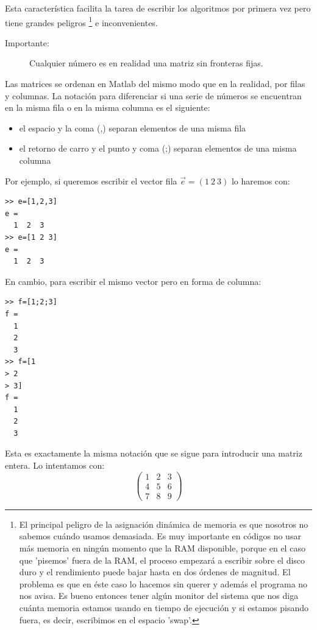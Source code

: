 Esta característica facilita la tarea de escribir los algoritmos por
primera vez pero tiene grandes peligros \footnote{El principal peligro
  de la asignación dinámica de memoria es que nosotros no sabemos
  cuándo usamos demasiada. Es muy importante en códigos no usar más
  memoria en ningún momento que la RAM disponible, porque en el caso
  que 'pisemos' fuera de la RAM, el proceso empezará a escribir sobre
  el disco duro y el rendimiento puede bajar hasta en dos órdenes de
  magnitud. El problema es que en éste caso lo hacemos sin querer y
  además el programa no nos avisa.  Es bueno entonces tener algún
  monitor del sistema que nos diga cuánta memoria estamos usando en
  tiempo de ejecución y si estamos pisando fuera, es decir, escribimos
  en el espacio 'swap'. %
} e inconvenientes.

\begin{description}
\item [Importante:]Cualquier número es en realidad una matriz sin
  fronteras fijas.
\end{description}
Las matrices se ordenan en Matlab del mismo modo que en la realidad,
por filas y columnas. La notación para diferenciar si una serie de
números se encuentran en la misma fila o en la misma columna es el
siguiente:

\begin{itemize}
\item el espacio y la coma (,) separan elementos de una misma fila
\item el retorno de carro y el punto y coma (;) separan elementos de
  una misma columna
\end{itemize}
Por ejemplo, si queremos escribir el vector fila $\vec{e}=(1\ 2\ 3)$
lo haremos con:

\begin{lstlisting}
>> e=[1,2,3]
e =
  1  2  3
>> e=[1 2 3]
e =
  1  2  3
\end{lstlisting}
En cambio, para escribir el mismo vector pero en forma de columna:

\begin{lstlisting}
>> f=[1;2;3]
f =
  1
  2
  3
>> f=[1
> 2
> 3]
f =
  1
  2
  3
\end{lstlisting}
Esta es exactamente la misma notación que se sigue para introducir una
matriz entera. Lo intentamos con:
$$ \left(
  \begin{array}{ccc}
    1 & 2 & 3\\
    4 & 5 & 6\\
    7 & 8 & 9
  \end{array}\right)$$

